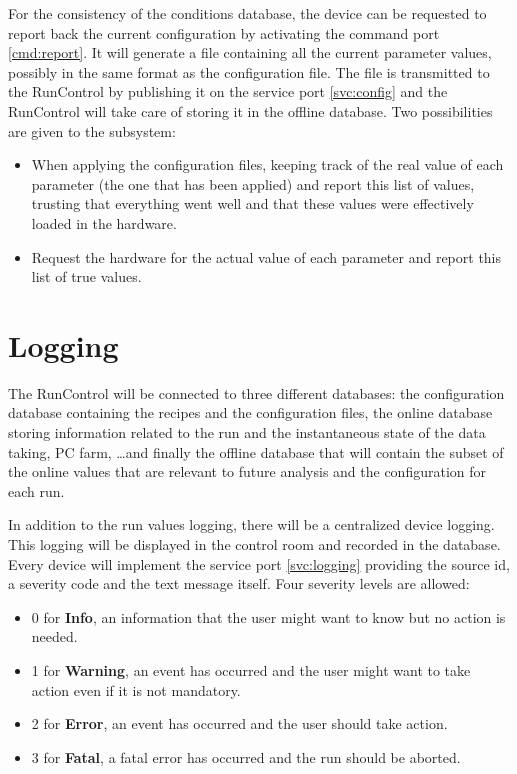 \documentclass[a4paper]{article}
\begin{document}
For the consistency of the conditions database, the device can be requested to
report back the current configuration by activating the command port
\ref{cmd:report}.
It will generate a file containing all the current parameter values, possibly in
the same format as the configuration file. The file is transmitted to the
RunControl by publishing it on the service port \ref{svc:config} and the
RunControl will take care of storing it in the offline database. Two
possibilities are given to the subsystem:
\begin{itemize}
	\item When applying the configuration files, keeping track of the real value of
	each parameter (the one that has been applied) and report this list of values,
	trusting that everything went well and that these values were effectively
	loaded in the hardware.
	\item Request the hardware for the actual value of each parameter and report
	this list of true values.
\end{itemize}

\section{Logging}\label{sec:logging}
The RunControl will be connected to three different databases: the configuration database containing
the recipes and the configuration files, the online database storing information related to the
run and the instantaneous state of the data taking, PC farm, \ldots and finally the offline
database that will contain the subset of the online values that are relevant to future analysis and
the configuration for each run.


In addition to the run values logging, there will be a centralized device logging. This logging will
be displayed in the control room and recorded in the database. Every device will implement the
service port \ref{svc:logging} providing the source id, a severity code and the
text message itself. Four severity levels are allowed:
\begin{itemize}
	\item 0 for \textbf{Info}, an information that the user might want to know but
	no action is needed.
	\item 1 for \textbf{Warning}, an event has occurred and the user might want to
	take action even if it is not mandatory.
	\item 2 for \textbf{Error}, an event has occurred and the user should take
	action.
	\item 3 for \textbf{Fatal}, a fatal error has occurred and the run should be
	aborted.
\end{itemize}
\end{document}
